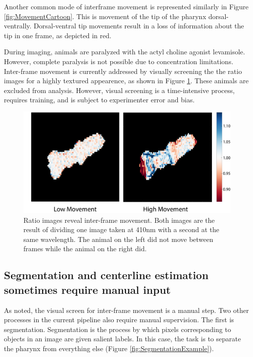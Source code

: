 Another common mode of interframe movement is represented similarly in Figure \ref{fig:MovementCartoon}. This is movement of the tip of the pharynx dorsal-ventrally. Dorsal-ventral tip movements result in a loss of information about the tip in one frame, as depicted in red.

During imaging, animals are paralyzed with the actyl choline agonist levamisole. However, complete paralysis is not possible due to concentration limitations. Inter-frame movement is currently addressed by visually screening the the ratio images for a highly textured appearence, as shown in Figure \ref{fig:HighMovement}. These animals are excluded from analysis. However, visual screening is a time-intensive process, requires training, and is subject to experimenter error and bias.

\begin{figure}[ht]
    \centering
    \includegraphics[scale=0.3]{Figures/rendered_files/low_high_movement}
    \decoRule
    \caption[A ratio image reveals inter-frame movement]{Ratio images reveal inter-frame movement. Both images are the result of dividing one image taken at 410nm with a second at the same wavelength. The animal on the left did not move between frames while the animal on the right did.}
    \label{fig:HighMovement}
\end{figure}

\subsection{Segmentation and centerline estimation sometimes require manual input} \label{limitationManual}

As noted, the visual screen for inter-frame movement is a manual step. Two other processes in the current pipeline also require manual supervision. The first is segmentation. Segmentation is the process by which pixels corresponding to objects in an image are given salient labels. In this case, the task is to separate the pharynx from everything else (Figure \ref{fig:SegmentationExample}). 

